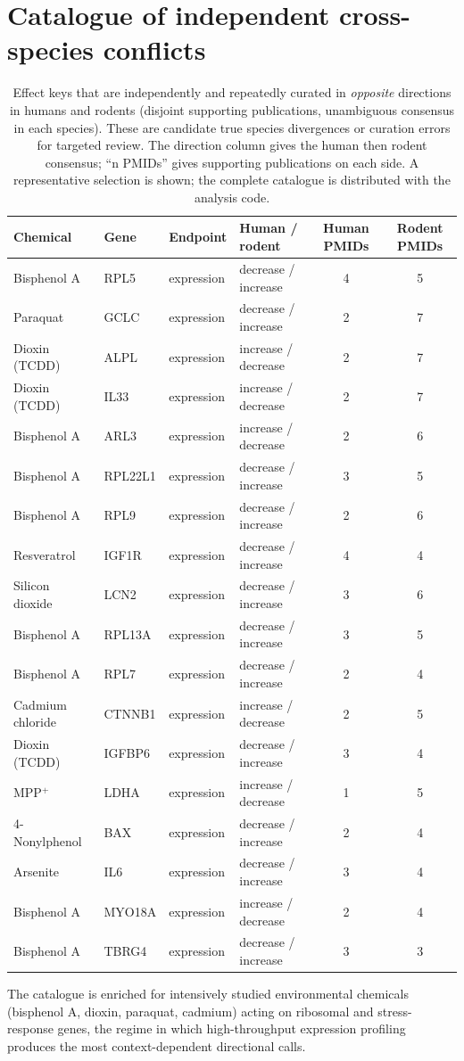 \documentclass[11pt]{elsarticle}
\begin{document}
\clearpage
\section{Catalogue of independent cross-species conflicts}

\begin{table}[H]
\small
\centering
\caption{Effect keys that are independently and repeatedly curated in
\emph{opposite} directions in humans and rodents (disjoint supporting
publications, unambiguous consensus in each species). These are candidate true
species divergences or curation errors for targeted review. The direction column
gives the human then rodent consensus; ``n PMIDs'' gives supporting publications
on each side. A representative selection is shown; the complete catalogue is
distributed with the analysis code.}
\label{tab:s9}
\begin{tabular}{llllcc}
\toprule
Chemical & Gene & Endpoint & Human / rodent & Human PMIDs & Rodent PMIDs \\
\midrule
Bisphenol A & RPL5 & expression & decrease / increase & 4 & 5 \\
Paraquat & GCLC & expression & decrease / increase & 2 & 7 \\
Dioxin (TCDD) & ALPL & expression & increase / decrease & 2 & 7 \\
Dioxin (TCDD) & IL33 & expression & increase / decrease & 2 & 7 \\
Bisphenol A & ARL3 & expression & increase / decrease & 2 & 6 \\
Bisphenol A & RPL22L1 & expression & decrease / increase & 3 & 5 \\
Bisphenol A & RPL9 & expression & decrease / increase & 2 & 6 \\
Resveratrol & IGF1R & expression & decrease / increase & 4 & 4 \\
Silicon dioxide & LCN2 & expression & decrease / increase & 3 & 6 \\
Bisphenol A & RPL13A & expression & decrease / increase & 3 & 5 \\
Bisphenol A & RPL7 & expression & decrease / increase & 2 & 4 \\
Cadmium chloride & CTNNB1 & expression & increase / decrease & 2 & 5 \\
Dioxin (TCDD) & IGFBP6 & expression & decrease / increase & 3 & 4 \\
MPP$^{+}$ & LDHA & expression & increase / decrease & 1 & 5 \\
4-Nonylphenol & BAX & expression & decrease / increase & 2 & 4 \\
Arsenite & IL6 & expression & decrease / increase & 3 & 4 \\
Bisphenol A & MYO18A & expression & increase / decrease & 2 & 4 \\
Bisphenol A & TBRG4 & expression & decrease / increase & 3 & 3 \\
\bottomrule
\end{tabular}
\end{table}

\noindent The catalogue is enriched for intensively studied environmental
chemicals (bisphenol A, dioxin, paraquat, cadmium) acting on ribosomal and
stress-response genes, the regime in which high-throughput expression profiling
produces the most context-dependent directional calls.
\end{document}
